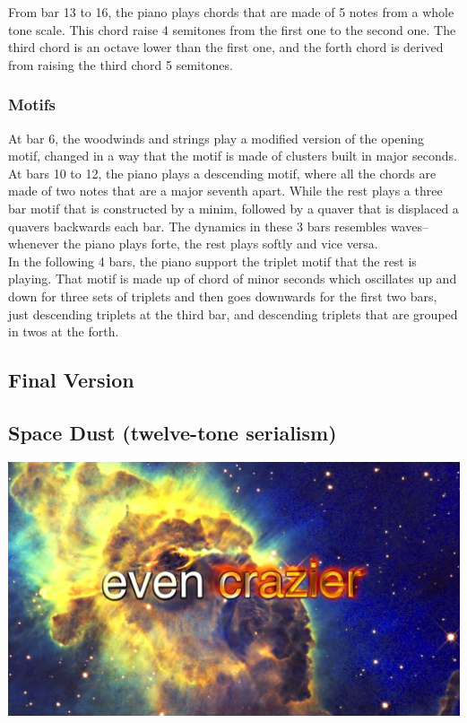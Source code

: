 \documentclass{article}
\begin{document}
From bar 13 to 16, the piano plays chords that are made of 5 notes from
a whole tone scale. This chord raise 4 semitones from the first one
to the second one. The third chord is an octave lower than the first one,
and the forth chord is derived from raising the third chord 5 semitones.

\subsubsection{Motifs}


At bar 6, the woodwinds and strings play a modified version
of the opening motif, changed in a way that the motif
is made of clusters built in major seconds.
At bars 10 to 12, the piano plays a descending motif,
where all the chords are made of two notes that are a major seventh apart.
While the rest plays a three bar motif that is constructed by a minim,
followed by a quaver that is displaced a quavers backwards each bar.
The dynamics in these 3 bars resembles waves--whenever the piano plays forte,
the rest plays softly and vice versa.\\

In the following 4 bars, the piano support the triplet motif that the rest is
playing. That motif is made up of chord of minor seconds which oscillates up
and down for three sets of triplets and then goes downwards for the first two
bars, just descending triplets at the third bar, and descending triplets
that are grouped in twos at the forth.

\subsection{Final Version}


\begin{center}
\vspace*{\fill}
\LARGE
    \section{Space Dust (twelve-tone serialism)}
    \includegraphics[width=\textwidth]{dust.jpg}
\vspace*{\fill}
%
\end{center}
\end{document}
